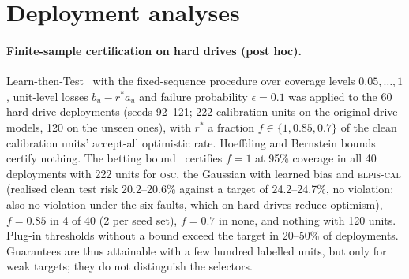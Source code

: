 \documentclass{esannV2}
\newcommand{\OSC}{\textsc{osc}}
\newcommand{\AUTO}{\textsc{elpis-cal}}
\begin{document}
\FloatBarrier
\section{Deployment analyses}\label{app:deploy}
\paragraph{Finite-sample certification on hard drives (post hoc).} Learn-then-Test~\cite{angelopoulos2021ltt} with the fixed-sequence procedure over coverage levels $0.05,\dots,1$, unit-level losses $b_u-r^\ast a_u$ and failure probability $\epsilon=0.1$ was applied to the 60 hard-drive deployments (seeds 92--121; 222 calibration units on the original drive models, 120 on the unseen ones), with $r^\ast$ a fraction $f\in\{1,0.85,0.7\}$ of the clean calibration units' accept-all optimistic rate. Hoeffding and Bernstein bounds certify nothing. The betting bound~\cite{waudbysmith2024betting} certifies $f=1$ at 95\% coverage in all 40 deployments with 222 units for \OSC, the Gaussian with learned bias and \AUTO{} (realised clean test risk 20.2--20.6\% against a target of 24.2--24.7\%, no violation; also no violation under the six faults, which on hard drives reduce optimism), $f=0.85$ in 4 of 40 (2 per seed set), $f=0.7$ in none, and nothing with 120 units. Plug-in thresholds without a bound exceed the target in 20--50\% of deployments. Guarantees are thus attainable with a few hundred labelled units, but only for weak targets; they do not distinguish the selectors.
\end{document}
